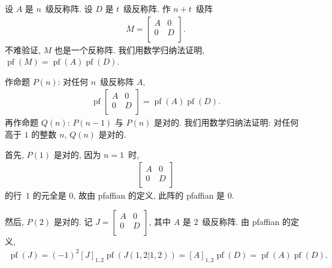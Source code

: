 \begin{example}
    设 \(A\) 是 \(n\)~级反称阵.
    设 \(D\) 是 \(t\)~级反称阵.
    作 \(n + t\)~级阵
    \begin{align*}
        M =
        \begin{bmatrix}
            A & 0 \\
            0 & D \\
        \end{bmatrix}.
    \end{align*}
    不难验证, \(M\) 也是一个反称阵.
    我们用数学归纳法证明, \(\operatorname{pf} {(M)}
    = \operatorname{pf} {(A)} \operatorname{pf} {(D)}\).

    作命题 \(P(n)\):
    对任何 \(n\)~级反称阵 \(A\),
    \begin{align*}
        \operatorname{pf} {
            \begin{bmatrix}
                A & 0 \\
                0 & D \\
            \end{bmatrix}
        } = \operatorname{pf} {(A)} \operatorname{pf} {(D)}.
    \end{align*}
    再作命题 \(Q(n)\):
    \(P(n-1)\) 与 \(P(n)\) 是对的.
    我们用数学归纳法证明:
    对任何高于 \(1\) 的整数 \(n\), \(Q(n)\) 是对的.

    首先, \(P(1)\) 是对的, 因为 \(n = 1\)~时,
    \begin{align*}
        \begin{bmatrix}
            A & 0 \\
            0 & D \\
        \end{bmatrix}
    \end{align*}
    的行~\(1\) 的元全是 \(0\),
    故由 pfaffian 的定义, 此阵的 pfaffian 是 \(0\).

    然后, \(P(2)\) 是对的.
    记 \(J =
    \begin{bmatrix}
        A & 0 \\
        0 & D \\
    \end{bmatrix}
    \),
    其中 \(A\) 是 \(2\)~级反称阵.
    由 pfaffian 的定义,
    \begin{align*}
        \operatorname{pf} {(J)}
        = (-1)^{2} [J]_{1,2} \operatorname{pf} {(J({1,2}|{1,2}))}
        = [A]_{1,2} \operatorname{pf} {(D)}
        = \operatorname{pf} {(A)} \operatorname{pf} {(D)}.
    \end{align*}


\end{example}
